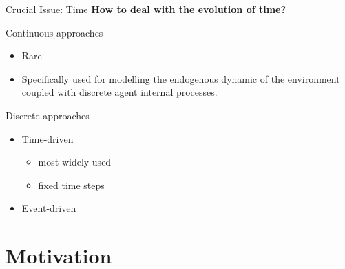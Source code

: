 \documentclass[presentation]{beamer} %
\begin{document}
\begin{frame}{Crucial Issue: Time}
\textbf{How to deal with the evolution of time?}

\begin{block}{Continuous approaches}
	\begin{itemize}
		\item Rare
		\item Specifically used for modelling the endogenous dynamic of the environment coupled with discrete agent internal processes. 
	\end{itemize}
\end{block}

\begin{block}{Discrete approaches}
	\begin{itemize}
		\item Time-driven	
		\begin{itemize}
			\item most widely used
			\item fixed time steps
		\end{itemize}
		\item Event-driven
	\end{itemize}
\end{block}

\end{frame}



\section{Motivation}
\end{document}
